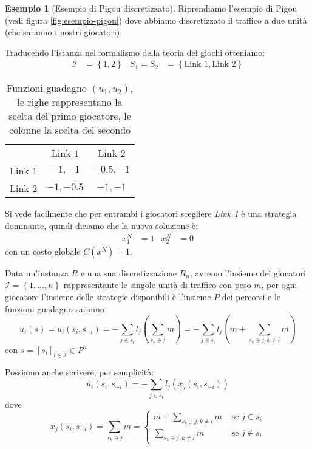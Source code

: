 \documentclass[a4paper]{article}
\newcounter{counter1}
\theoremstyle{plain}
\theoremstyle{definition}
\newtheorem{myes}[counter1]{Esempio}
\theoremstyle{remark}
\newcommand{\set}[1]{\left\{#1\right\}}
\newcommand{\pa}[1]{\left(#1\right)}
\newcommand{\bra}[1]{\left[#1\right]}
\begin{document}
\begin{myes}[Esempio di Pigou discretizzato]
  Riprendiamo l'esempio di Pigou (vedi figura \ref{fig:esempio-pigou})
  dove abbiamo discretizzato il traffico a due unità (che saranno i
  nostri giocatori).

  Traducendo l'istanza nel formalismo della teoria dei giochi
  otteniamo:
  \begin{align*}
    \mathcal{I} &= \set{1,2} & S_1 = S_2 & = \set{\text{Link 1},
                                           \text{Link 2}}
  \end{align*}
  \begin{table}[!ht]
    \centering
    \begin{tabular}{rcc}
      & Link $1$ & Link $2$ \\
      \cline{2-3}
      Link $1$ & \multicolumn{1}{|c|}{$-1,-1$} & \multicolumn{1}{|c|}{$-0.5,-1$}  \\
      \cline{2-3}
      Link $2$ & \multicolumn{1}{|c|}{$-1,-0.5$} & \multicolumn{1}{|c|}{$-1,-1$}  \\
      \cline{2-3}
    \end{tabular}
    \caption{Funzioni guadagno $(u_1,u_2)$, le righe rappresentano la
      scelta del primo giocatore, le colonne la scelta del secondo}
    \label{tab:pigou-nash}
  \end{table}

  Si vede facilmente che per entrambi i giocatori scegliere
  \textit{Link 1} è una strategia dominante, quindi diciamo che la
  nuova soluzione è:
  \begin{align*}
    x^{N}_1 &= 1 & x^{N}_2 &= 0
  \end{align*}
  con un costo globale $C\pa{x^{N}} = 1$.
\end{myes}

Data un'instanza $R$ e una sua discretizzazione $R_n$, avremo
l'insieme dei giocatori $\mathcal{I} = \set{1,...,n}$ rappresentante
le singole unità di traffico con peso $m$, per ogni giocatore
l'insieme delle strategie disponibili è l'insieme $P$ dei percorsi e
le funzioni guadagno saranno
\[ u_i \pa{s} = u_i\pa{s_i, s_{-i}} = - \sum _{j\in s_i}
  l_j\pa{\sum_{s_k\ni j} m} = -\sum _{j\in s_i} l_j\pa{m + \sum_{s_k\ni
      j,k\neq i} m} \]
con $s = \bra{s_i}_{i\in\mathcal{I}} \in P^n$

Possiamo anche scrivere, per semplicità:
\[ u_i\pa{s_i, s_{-i}} = - \sum _{j\in s_i} l_j\pa{x_j\pa{s_i, s_{-i}}} \]
dove
\[ x_j\pa{s_i,s_{-i}} = \sum_{s_k\ni j} m = \left\{ 
    \begin{matrix}
      m + \sum_{s_k\ni j,k\neq i} m & \text{ se } j\in s_i \\
      \sum_{s_k\ni j,k\neq i} m & \text{ se } j\not\in s_i
    \end{matrix}
  \right.
\]
\end{document}
